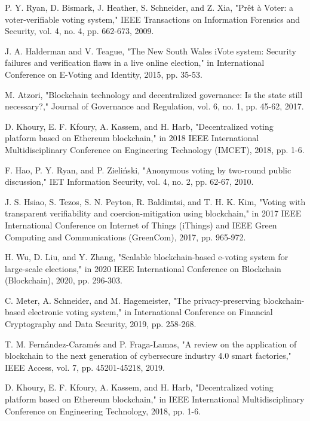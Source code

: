 \documentclass[conference]{IEEEtran}
\begin{document}
\begin{thebibliography}{10}

 P. Y. Ryan, D. Bismark, J. Heather, S. Schneider, and Z. Xia, "Prêt à Voter: a voter-verifiable voting system," IEEE Transactions on Information Forensics and Security, vol. 4, no. 4, pp. 662-673, 2009.

 J. A. Halderman and V. Teague, "The New South Wales iVote system: Security failures and verification flaws in a live online election," in International Conference on E-Voting and Identity, 2015, pp. 35-53.

 M. Atzori, "Blockchain technology and decentralized governance: Is the state still necessary?," Journal of Governance and Regulation, vol. 6, no. 1, pp. 45-62, 2017.

 D. Khoury, E. F. Kfoury, A. Kassem, and H. Harb, "Decentralized voting platform based on Ethereum blockchain," in 2018 IEEE International Multidisciplinary Conference on Engineering Technology (IMCET), 2018, pp. 1-6.

 F. Hao, P. Y. Ryan, and P. Zieliński, "Anonymous voting by two-round public discussion," IET Information Security, vol. 4, no. 2, pp. 62-67, 2010.

 J. S. Hsiao, S. Tezos, S. N. Peyton, R. Baldimtsi, and T. H. K. Kim, "Voting with transparent verifiability and coercion-mitigation using blockchain," in 2017 IEEE International Conference on Internet of Things (iThings) and IEEE Green Computing and Communications (GreenCom), 2017, pp. 965-972.

 H. Wu, D. Liu, and Y. Zhang, "Scalable blockchain-based e-voting system for large-scale elections," in 2020 IEEE International Conference on Blockchain (Blockchain), 2020, pp. 296-303.

 C. Meter, A. Schneider, and M. Hagemeister, "The privacy-preserving blockchain-based electronic voting system," in International Conference on Financial Cryptography and Data Security, 2019, pp. 258-268.

 T. M. Fernández-Caramés and P. Fraga-Lamas, "A review on the application of blockchain to the next generation of cybersecure industry 4.0 smart factories," IEEE Access, vol. 7, pp. 45201-45218, 2019.

 D. Khoury, E. F. Kfoury, A. Kassem, and H. Harb, "Decentralized voting platform based on Ethereum blockchain," in IEEE International Multidisciplinary Conference on Engineering Technology, 2018, pp. 1-6.


\end{thebibliography}
\end{document}
